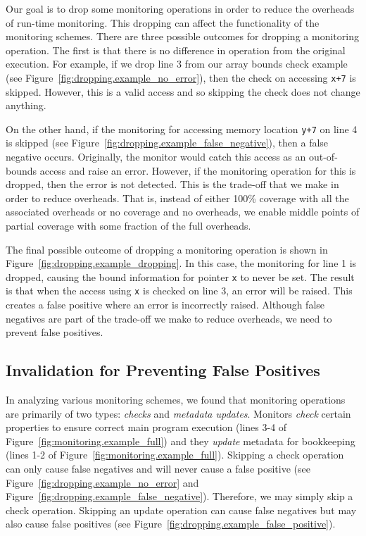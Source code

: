 Our goal is to drop some monitoring operations in order to reduce the overheads
of run-time monitoring. This dropping can affect the functionality of the
monitoring schemes. There are three possible outcomes for dropping a
monitoring operation. The first is that there is no difference in operation
from the original execution. For example, if we drop line 3 from our array
bounds check example (see Figure~\ref{fig:dropping.example_no_error}), then the
check on accessing {\tt x+7} is skipped. However, this is a valid access and so
skipping the check does not change anything.

On the other hand, if the monitoring for accessing memory location {\tt y+7} on
line 4 is skipped (see Figure~\ref{fig:dropping.example_false_negative}), then
a false negative occurs. Originally, the monitor would catch this access as an
out-of-bounds access and raise an error. However, if the monitoring operation
for this is dropped, then the error is not detected. This is the trade-off that
we make in order to reduce overheads. That is, instead of either 100\% coverage
with all the associated overheads or no coverage and no overheads, we 
enable middle points of partial coverage with some fraction of the full
overheads.

The final possible outcome of dropping a monitoring operation is shown in
Figure~\ref{fig:dropping.example_dropping}. In this case, the monitoring for
line 1 is dropped, causing the bound information for pointer {\tt x} to never
be set. The result is that when the access using {\tt x} is checked on line 3,
an error will be raised. This creates a false positive where an error is
incorrectly raised. Although false negatives are part of the trade-off we make
to reduce overheads, we need to prevent false positives.

\subsection{Invalidation for Preventing False Positives}
\label{sec:dropping.prevent_false_pos}

In analyzing various monitoring schemes, we found that monitoring operations
are primarily of two types: \emph{checks} and \emph{metadata updates}. Monitors
\emph{check} certain properties to ensure correct main program execution (lines
3-4 of Figure~\ref{fig:monitoring.example_full}) and they \emph{update} metadata
for bookkeeping (lines 1-2 of Figure~\ref{fig:monitoring.example_full}). Skipping
a check operation can only cause false negatives and will never cause a false
positive (see Figure~\ref{fig:dropping.example_no_error} and
Figure~\ref{fig:dropping.example_false_negative}). Therefore, we may simply
skip a check operation. Skipping an update operation can cause false
negatives but may also cause false positives (see
Figure~\ref{fig:dropping.example_false_positive}). 

